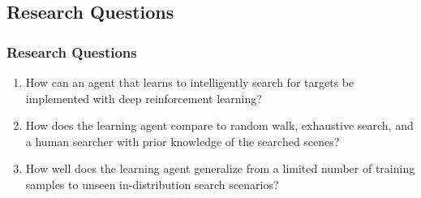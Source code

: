 \subsection{Research Questions}

\begin{frame}
    \frametitle{Research Questions}
    \begin{enumerate}
        \item How can an agent that learns to intelligently search for targets be implemented with deep reinforcement learning?
        \item How does the learning agent compare to random walk, exhaustive search, and a human searcher with prior knowledge of the searched scenes?
        \item How well does the learning agent generalize from a limited number of training samples to unseen in-distribution search scenarios?
    \end{enumerate}    
\end{frame}